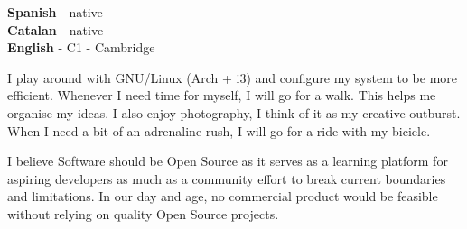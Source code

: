 \documentclass[9pt]{developercv} %
\begin{document}

\begin{minipage}[t]{0.3\textwidth}
	\vspace{-\baselineskip} %

	
	\textbf{Spanish} - native\\
	\textbf{Catalan} - native\\
	\textbf{English} - C1 - Cambridge
\end{minipage}
\hfill
\begin{minipage}[t]{0.3\textwidth}
	\vspace{-\baselineskip} %
	
	
	
	I play around with GNU/Linux (Arch + i3) and configure my system to be more efficient.
	Whenever I need time for myself, I will go for a walk. This helps me organise my ideas.
	I also enjoy photography, I think of it as my creative outburst.
	When I need a bit of an adrenaline rush, I will go for a ride with my bicicle.
\end{minipage}
\hfill
\begin{minipage}[t]{0.3\textwidth}
	\vspace{-\baselineskip} %
	
	
	I believe Software should be Open Source as it serves as a learning platform for aspiring developers as much as a community effort to break current boundaries and limitations. In our day and age, no commercial product would be feasible without relying on quality Open Source projects.
\end{minipage}

\end{document}
